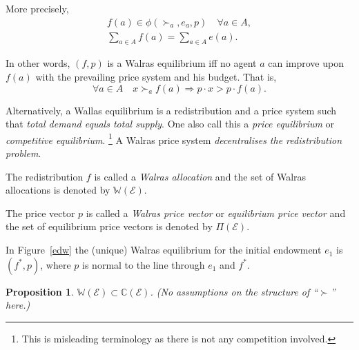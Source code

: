\documentclass[a4paper]{amsart}
\theoremstyle{plain}
\newtheorem{proposition}[theorem]{Proposition}
\theoremstyle{definition}
\theoremstyle{remark}
\begin{document}
More precisely,
\begin{equation} \label{}
\begin{gathered}
  f(a) \in \phi(\succ_a, e_a, p) \quad  \forall a \in A, \\
  \sum_{a\in A} f(a) =   \sum_{a\in A} e(a).
  \end{gathered} 
  \end{equation} 

In other words, $ (f,p) $ is a Walras equilibrium iff  no agent $ a $ can improve upon $ f(a) $  with the prevailing price system and his budget.
That is, 
\begin{equation} \label{weni}
   \forall a \in A\quad   x \succ_a f(a) \Longrightarrow p\cdot x > p\cdot f(a)  .
\end{equation} 


Alternatively,  a Wallas equilibrium is a redistribution  and a price system  such that \emph{total demand equals total supply}.  One also call this a \emph{price equilibrium}  or \emph{competitive equilibrium}.%
\footnote{This is misleading terminology as there is not any competition involved.}  A Walras price system    \emph{decentralises the redistribution problem}.



\medskip
The redistribution $ f $ is called a \emph{Walras allocation} and the set of Walras allocations is denoted by $ \mathbb{W} (\mathcal{E} )$.

The price vector $ p $ is called a   \emph{Walras price vector} or \emph{equilibrium price vector}    and the set of equilibrium price vectors is denoted by $ \Pi(\mathcal{E} )$.  

 
\medskip In Figure~\ref{edw} the (unique) Walras equilibrium for the initial endowment $e_1 $  is $ (f^*,p) $, where $ p $ is normal to the line through $ e_1 $ and $ f^*$.

\medskip 

\begin{proposition}  $ \mathbb{W} (\mathcal{E} ) \subset   \mathbb{C} (\mathcal{E} )$. (\emph{No} assumptions on the structure of ``$ \succ $'' here.)
\end{proposition}
\end{document}
